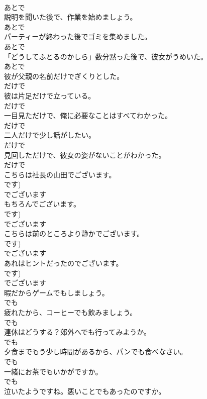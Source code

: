\documentclass[8pt]{extreport}
\begin{document}
\begin{CJK}{UTF8}{min}
\\	あとで
\\	説明を聞いた後で、作業を始めましょう。	
\\	あとで
\\	パーティーが終わった後でゴミを集めました。	
\\	あとで
\\	「どうしてふとるのかしら」数分黙った後で、彼女がうめいた。	
\\	あとで
\\	彼が父親の名前だけでぎくりとした。	
\\	だけで
\\	彼は片足だけで立っている。	
\\	だけで
\\	一目見ただけで、俺に必要なことはすべてわかった。	
\\	だけで
\\	二人だけで少し話がしたい。	
\\	だけで
\\	見回しただけで、彼女の姿がないことがわかった。	
\\	だけで
\\	こちらは社長の山田でございます。	
\\	です)	
\\	でございます
\\	もちろんでございます。	
\\	です)	
\\	でございます
\\	こちらは前のところより静かでございます。	
\\	です)	
\\	でございます
\\	あれはヒントだったのでございます。	
\\	です)	
\\	でございます
\\	暇だからゲームでもしましょう。	
\\	でも
\\	疲れたから、コーヒーでも飲みましょう。	
\\	でも
\\	連休はどうする？郊外へでも行ってみようか。	
\\	でも
\\	夕食までもう少し時間があるから、パンでも食べなさい。	
\\	でも
\\	一緒にお茶でもいかがですか。	
\\	でも
\\	泣いたようですね。悪いことでもあったのですか。	

\end{CJK}
\end{document}
